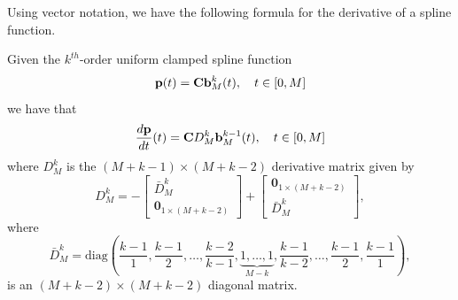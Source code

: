 Using vector notation, we have the following formula for the derivative of a spline function.
\begin{lemma} \label{lem:derivative_of_spline}
Given the $k^{th}$-order uniform clamped spline function
\[
\mathbf{p}(t) = \mathbf{C} \mathbf{b}_M^k(t), \quad t\in[0, M]
\]
we have that
\[
\frac{d\mathbf{p}}{dt}(t) = \mathbf{C} D_M^k \mathbf{b}_M^{k-1}(t), \quad t\in[0, M]
\]	
where $D_M^k$ is the $(M+k-1)\times (M+k-2)$ derivative matrix given by
\begin{equation}\label{eq:D_k}
D_M^k = -\begin{bmatrix}\bar{D}_M^k \\ \mathbf{0}_{1\times(M+k-2)} \end{bmatrix} + \begin{bmatrix}\mathbf{0}_{1\times(M+k-2)} \\ \bar{D}_M^k \end{bmatrix},
\end{equation}
where
\begin{equation}\label{eq:D_k_bar}
\bar{D}_M^k = \text{diag}\left(\frac{k-1}{1}, \frac{k-1}{2}, \dots, \frac{k-2}{k-1}, \underbrace{1, \dots, 1}_{M-k}, \frac{k-1}{k-2}, \dots, \frac{k-1}{2}, \frac{k-1}{1}\right),
\end{equation}
is an $(M+k-2)\times(M+k-2)$ diagonal matrix.
\end{lemma}
